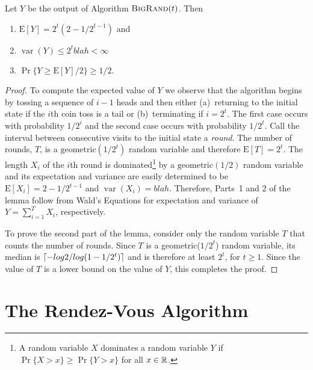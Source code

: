 \documentclass[lotsofwhite]{patmorin}
\newcommand{\bigrand}{\textsc{BigRand}}
\newcommand{\E}{\mathrm{E}}
\DeclareMathOperator{\var}{var}
\begin{document}
\begin{lem}
Let $Y$ be the output of Algorithm $\bigrand(t)$.  Then 
\begin{enumerate}
\item $\E[Y]=2^t(2-1/2^{t-1})$ and
\item $\var(Y) \le 2^t blah < \infty$
\item $\Pr\{Y \ge \E[Y] / 2\} \ge 1/2$.
\end{enumerate}
\end{lem}

\begin{proof}
To compute the expected value of $Y$ we observe that the algorithm
begins by tossing a sequence of $i-1$ heads and then either
(a)~returning to the initial state if the $i$th coin toss is a tail or
(b)~terminating if $i=2^t$.  The first case occurs with probability
$1/2^i$ and the second case occurs with probability $1/2^t$.  Call the
interval between consecutive visits to the initial state a
\emph{round}.  The number of rounds, $T$, is a
$\mathrm{geometric}(1/2^t)$ random variable and therefore $\E[T] =
2^t$.  The length $X_i$ of the $i$th round is dominated\footnote{A random
variable $X$ dominates a random variable $Y$ if $\Pr\{X > x\}\ge
\Pr\{Y > x\}$ for all $x\in\mathbb{R}$.} by a
$\mathrm{geometric}(1/2)$ random variable and its expectation and
variance are easily determined to be 
$\E[X_i]=2-1/2^{t-1}$ and $\var(X_i) = blah$.  Therefore, Parts~1 and
2 of the lemma follow from Wald's Equations for expectation and
variance of $Y=\sum_{i=1}^T X_i$, respectively.


To prove the second part of the lemma, consider only the random
variable $T$ that counts the number of rounds.  Since $T$ is a
geometric($1/2^t$) random variable, its median is $\left\lceil -log
2/log(1-1/2^t) \right\rceil$ and is therefore at least $2^t$, for $t \ge 1$.
Since the value of $T$ is a lower bound on the value of $Y$, this
completes the proof.
\end{proof}

\section{The Rendez-Vous Algorithm}
\end{document}
